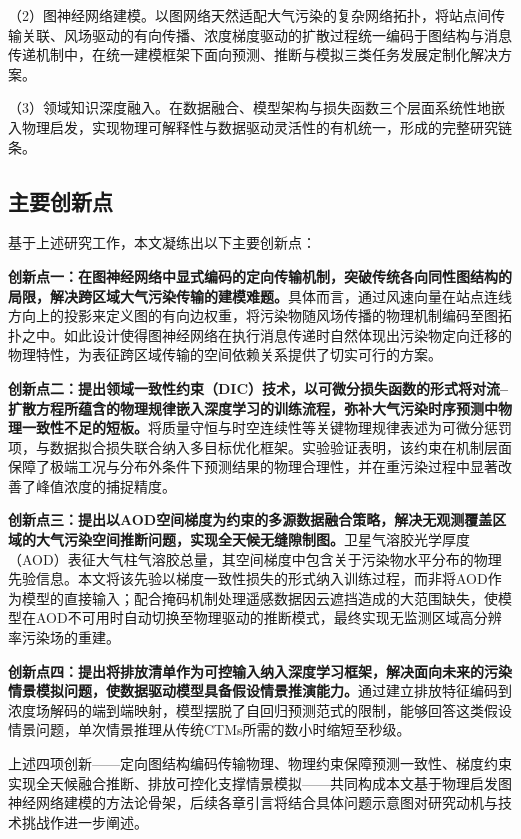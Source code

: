 （2）图神经网络建模。以图网络天然适配大气污染的复杂网络拓扑，将站点间传输关联、风场驱动的有向传播、浓度梯度驱动的扩散过程统一编码于图结构与消息传递机制中，在统一建模框架下面向预测、推断与模拟三类任务发展定制化解决方案。

（3）领域知识深度融入。在数据融合、模型架构与损失函数三个层面系统性地嵌入物理启发，实现物理可解释性与数据驱动灵活性的有机统一，形成的完整研究链条。

\subsection{主要创新点}
\label{subsec:innovations}

基于上述研究工作，本文凝练出以下主要创新点：

\textbf{创新点一：在图神经网络中显式编码的定向传输机制，突破传统各向同性图结构的局限，解决跨区域大气污染传输的建模难题。}具体而言，通过风速向量在站点连线方向上的投影来定义图的有向边权重，将污染物随风场传播的物理机制编码至图拓扑之中。如此设计使得图神经网络在执行消息传递时自然体现出污染物定向迁移的物理特性，为表征跨区域传输的空间依赖关系提供了切实可行的方案。

\textbf{创新点二：提出领域一致性约束（DIC）技术，以可微分损失函数的形式将对流--扩散方程所蕴含的物理规律嵌入深度学习的训练流程，弥补大气污染时序预测中物理一致性不足的短板。}将质量守恒与时空连续性等关键物理规律表述为可微分惩罚项，与数据拟合损失联合纳入多目标优化框架。实验验证表明，该约束在机制层面保障了极端工况与分布外条件下预测结果的物理合理性，并在重污染过程中显著改善了峰值浓度的捕捉精度。

\textbf{创新点三：提出以AOD空间梯度为约束的多源数据融合策略，解决无观测覆盖区域的大气污染空间推断问题，实现全天候无缝隙制图。}卫星气溶胶光学厚度（AOD）表征大气柱气溶胶总量，其空间梯度中包含关于污染物水平分布的物理先验信息。本文将该先验以梯度一致性损失的形式纳入训练过程，而非将AOD作为模型的直接输入；配合掩码机制处理遥感数据因云遮挡造成的大范围缺失，使模型在AOD不可用时自动切换至物理驱动的推断模式，最终实现无监测区域高分辨率污染场的重建。

\textbf{创新点四：提出将排放清单作为可控输入纳入深度学习框架，解决面向未来的污染情景模拟问题，使数据驱动模型具备假设情景推演能力。}通过建立排放特征编码到浓度场解码的端到端映射，模型摆脱了自回归预测范式的限制，能够回答这类假设情景问题，单次情景推理从传统CTMs所需的数小时缩短至秒级。

上述四项创新——定向图结构编码传输物理、物理约束保障预测一致性、梯度约束实现全天候融合推断、排放可控化支撑情景模拟——共同构成本文基于物理启发图神经网络建模的方法论骨架，后续各章引言将结合具体问题示意图对研究动机与技术挑战作进一步阐述。

